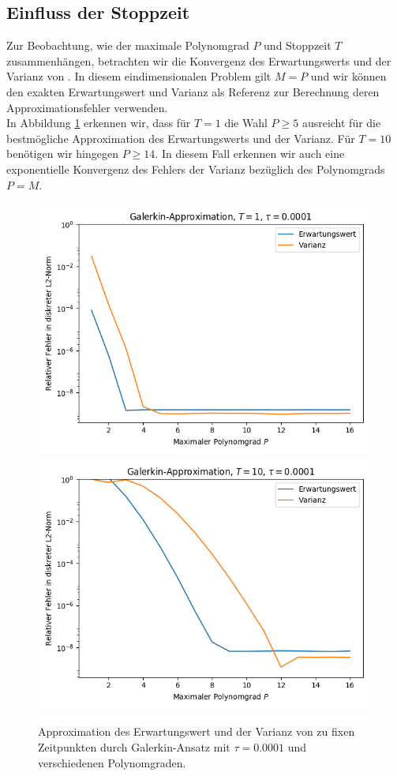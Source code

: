 \subsection{Einfluss der Stoppzeit}
Zur Beobachtung, wie der maximale Polynomgrad $P$ und Stoppzeit $T$ zusammenhängen, betrachten wir die Konvergenz des Erwartungswerts und der Varianz von . In diesem eindimensionalen Problem gilt $M=P$ und wir können den exakten Erwartungswert und Varianz als Referenz zur Berechnung deren Approximationsfehler verwenden.\\
In Abbildung \ref{fig:galerkin_bydegree_trial1} erkennen wir, dass für $T=1$ die Wahl $P\ge 5$ ausreicht für die bestmögliche Approximation des Erwartungswerts und der Varianz. Für $T=10$ benötigen wir hingegen $P\ge 14$. In diesem Fall erkennen wir auch eine exponentielle Konvergenz des Fehlers der Varianz bezüglich des Polynomgrads $P=M$.
\begin{figure}[!htb]
  \includegraphics[width=\linewidth]{Figures/galerkin_bydegree_trial1_t1.png}
\endminipage
{}
  \includegraphics[width=\linewidth]{Figures/galerkin_bydegree_trial1_t10.png}
\endminipage
  \caption{Approximation des Erwartungswert und der Varianz von  zu fixen Zeitpunkten durch Galerkin-Ansatz mit $\tau=0.0001$ und verschiedenen Polynomgraden.}
  \label{fig:galerkin_bydegree_trial1}
\end{figure}
